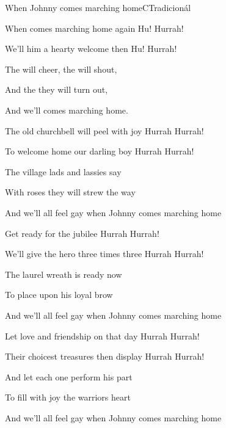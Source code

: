 \begin{song}{When Johnny comes marching home}{C}{Tradicionál}

\begin{SBVerse}

When  comes marching home again Hu! Hurrah!

We’ll  him a hearty welcome then Hu! Hurrah!

The  will cheer, the  will shout,

And the  they will  turn out,

And we’ll      comes marching home.

\end{SBVerse}

\begin{SBVerse}

The old churchbell will peel with joy Hurrah Hurrah!

To welcome home our darling boy Hurrah Hurrah!

The village lads and lassies say

With roses they will strew the way

And we’ll all feel gay when Johnny comes marching home

\end{SBVerse}

\begin{SBVerse}

Get ready for the jubilee Hurrah Hurrah!

We’ll give the hero three times three Hurrah Hurrah!

The laurel wreath is ready now

To place upon his loyal brow

And we’ll all feel gay when Johnny comes marching home

\end{SBVerse}

\begin{SBVerse}

Let love and friendship on that day Hurrah Hurrah!

Their choicest treasures then display Hurrah Hurrah!

And let each one perform his part

To fill with joy the warriors heart

And we’ll all feel gay when Johnny comes marching home

\end{SBVerse}

\end{song}

\clearpage
